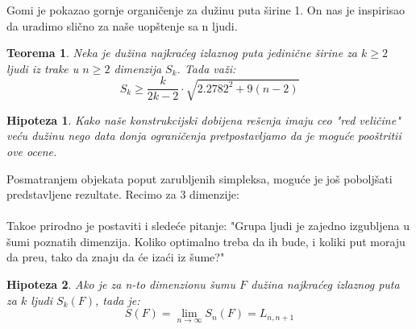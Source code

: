 \documentclass[b1paper,portrait]{template/baposter}
\newtheorem{theorem}{Teorema}
\newtheorem*{hipoteza}{Hipoteza}
\begin{document}
\begin{poster}
{
	Gomi je pokazao gornje organi\v cenje za du\v zinu puta \v sirine 1.
	On nas je inspirisao da uradimo sli\v cno za na\v se uop\v stenje sa n ljudi.
	\begin{theorem}
		Neka je du\v zina najkra\' ceg izlaznog puta jedini\v cne \v sirine za $k\geqslant 2$ ljudi iz trake u $n\geqslant 2$ dimenzija $S_k$. Tada va\v zi:
		$$S_k\geqslant\frac{k}{2k-2}\cdot \sqrt{2.2782^2+9(n-2)}$$
	\end{theorem}
	\begin{hipoteza}
		Kako na\v se konstrukcijski dobijena re\v senja imaju ceo "red veli\v cine" ve\' cu du\v zinu nego 
		data donja ograni\v cenja pretpostavljamo da je mogu\' ce poo\v stritii ove ocene. 
	\end{hipoteza}
	\vspace{0.15cm}
}

{
	Posmatranjem objekata poput zarubljenih simpleksa, mogu\' ce je jo\v s pobolj\v sati predstavljene rezultate. Recimo za 3 dimenzije:\\ \\
	Tako\dj e prirodno je postaviti i slede\' ce pitanje:
	"Grupa ljudi je zajedno izgubljena u \v sumi poznatih dimenzija. Koliko optimalno treba da ih bude,
	i koliki put moraju da pre\dj u, tako da znaju da \' ce iza\' ci iz \v sume?"
	\begin{hipoteza}
		Ako je za n-to dimenzionu \v sumu $F$ du\v zina najkra\' ceg izlaznog puta za $k$ ljudi $S_k(F)$, tada je:
		$$S(F)=\lim_{n \to \infty} S_n(F) = L_{n,n+1}$$
	\end{hipoteza}
	\vspace{0.15cm}
}

\end{poster}
\end{document}
